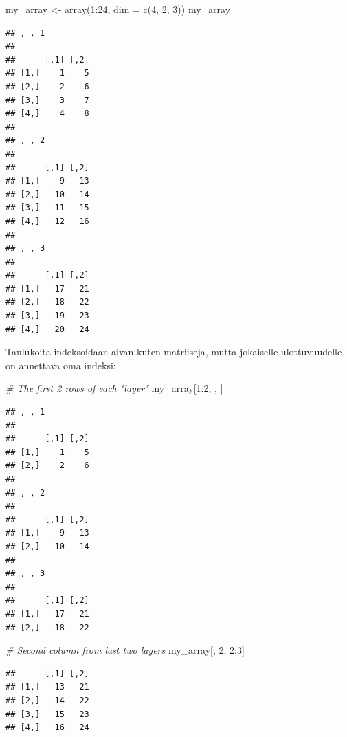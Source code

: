 \documentclass[
]{book}
\newenvironment{Shaded}{\begin{snugshade}}{\end{snugshade}}
\newcommand{\AttributeTok}[1]{\textcolor[rgb]{0.77,0.63,0.00}{#1}}
\newcommand{\CommentTok}[1]{\textcolor[rgb]{0.56,0.35,0.01}{\textit{#1}}}
\newcommand{\DecValTok}[1]{\textcolor[rgb]{0.00,0.00,0.81}{#1}}
\newcommand{\FunctionTok}[1]{\textcolor[rgb]{0.00,0.00,0.00}{#1}}
\newcommand{\NormalTok}[1]{#1}
\newcommand{\OtherTok}[1]{\textcolor[rgb]{0.56,0.35,0.01}{#1}}
\newcommand{\SpecialCharTok}[1]{\textcolor[rgb]{0.00,0.00,0.00}{#1}}
\begin{document}
\begin{Shaded}
\begin{Highlighting}[]
\NormalTok{my\_array }\OtherTok{\textless{}{-}} \FunctionTok{array}\NormalTok{(}\DecValTok{1}\SpecialCharTok{:}\DecValTok{24}\NormalTok{, }\AttributeTok{dim =} \FunctionTok{c}\NormalTok{(}\DecValTok{4}\NormalTok{, }\DecValTok{2}\NormalTok{, }\DecValTok{3}\NormalTok{))}
\NormalTok{my\_array}
\end{Highlighting}
\end{Shaded}

\begin{verbatim}
## , , 1
## 
##      [,1] [,2]
## [1,]    1    5
## [2,]    2    6
## [3,]    3    7
## [4,]    4    8
## 
## , , 2
## 
##      [,1] [,2]
## [1,]    9   13
## [2,]   10   14
## [3,]   11   15
## [4,]   12   16
## 
## , , 3
## 
##      [,1] [,2]
## [1,]   17   21
## [2,]   18   22
## [3,]   19   23
## [4,]   20   24
\end{verbatim}

Taulukoita indeksoidaan aivan kuten matriiseja, mutta jokaiselle ulottuvuudelle on annettava oma indeksi:

\begin{Shaded}
\begin{Highlighting}[]
\CommentTok{\# The first 2 rows of each "layer"}
\NormalTok{my\_array[}\DecValTok{1}\SpecialCharTok{:}\DecValTok{2}\NormalTok{, , ]}
\end{Highlighting}
\end{Shaded}

\begin{verbatim}
## , , 1
## 
##      [,1] [,2]
## [1,]    1    5
## [2,]    2    6
## 
## , , 2
## 
##      [,1] [,2]
## [1,]    9   13
## [2,]   10   14
## 
## , , 3
## 
##      [,1] [,2]
## [1,]   17   21
## [2,]   18   22
\end{verbatim}

\begin{Shaded}
\begin{Highlighting}[]
\CommentTok{\# Second column from last two layers}
\NormalTok{my\_array[, }\DecValTok{2}\NormalTok{, }\DecValTok{2}\SpecialCharTok{:}\DecValTok{3}\NormalTok{]}
\end{Highlighting}
\end{Shaded}

\begin{verbatim}
##      [,1] [,2]
## [1,]   13   21
## [2,]   14   22
## [3,]   15   23
## [4,]   16   24
\end{verbatim}
\end{document}
